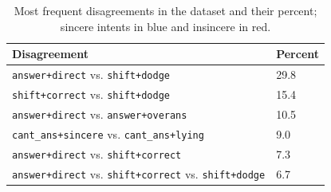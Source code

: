 \begin{table}
\centering
\small
\begin{tabular}{>{\raggedright\arraybackslash}ll}
\toprule
Disagreement  &Percent\\ 
\midrule
\texttt{answer+{\color{blue}direct}} vs. \texttt{shift+{\color{red}dodge}} &29.8\\
\texttt{shift+{\color{blue}correct}} vs. \texttt{shift+{\color{red}dodge}} &15.4 \\
\texttt{answer+{\color{blue}direct}} vs. \texttt{answer+{\color{red}overans}} &10.5 \\
\texttt{cant\_ans+{\color{blue}sincere}} vs. \texttt{cant\_ans+{\color{red}lying}} &\phantom{0}9.0 \\
\texttt{answer+{\color{blue}direct}} vs. \texttt{shift+{\color{blue}correct}} &\phantom{0}7.3 \\
\texttt{answer+{\color{blue}direct}} vs. \texttt{shift+{\color{blue}correct}} vs. \texttt{shift+{\color{red}dodge}}&\phantom{0}6.7\\
\bottomrule
\end{tabular}
\vspace{-.3em}
\caption{Most frequent disagreements in the dataset and their percent; sincere intents in {\color{blue}blue} and insincere in {\color{red}red}.}
\label{tab:subj_label_set_disagree}
\end{table}



